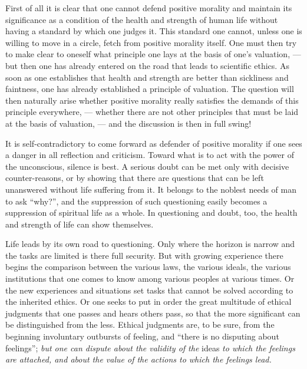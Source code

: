\documentclass[12pt,a4paper,openany]{book}
\newcommand{\opage}[1]{\marginnote{\footnotesize\textit{[#1]}}}
\begin{document}
First of all it is clear that one cannot defend positive morality and maintain its significance as
a condition of the health and strength of human life without having a standard by which one judges
it. This standard one cannot, unless one is willing to move in a circle, fetch from positive
morality itself. One must then try to make clear to oneself what principle one lays at the basis of
one's valuation, --- but then one has already entered on the road that leads to scientific ethics.
As soon as one establishes that health and strength are better than sickliness and faintness, one
has already established a principle of valuation. The question will then naturally arise whether
positive morality really satisfies the demands of this principle everywhere, --- whether there are
not other principles that must be laid at the basis of valuation, --- and the discussion is then in
full swing!

It is self-contradictory to come forward as defender of positive morality if one sees a danger in
all reflection and criticism. Toward what is to act with the power of the unconscious, silence is
best. A serious doubt can be met only with decisive counter-reasons, or by showing that there are
questions that can be left unanswered without life suffering from it. It belongs to the noblest
needs of man to ask
\opage{8}``why?'', and the suppression of such questioning easily becomes a suppression of spiritual
life as a whole. In questioning and doubt, too, the health and strength of life can show
themselves.

Life leads by its own road to questioning. Only where the horizon is narrow and the tasks are
limited is there full security. But with growing experience there begins the comparison between
the various laws, the various ideals, the various institutions that one comes to know among
various peoples at various times. Or the new experiences and situations set tasks that cannot be
solved according to the inherited ethics. Or one seeks to put in order the great multitude of
ethical judgments that one passes and hears others pass, so that the more significant can be
distinguished from the less. Ethical judgments are, to be sure, from the beginning involuntary
outbursts of feeling, and ``there is no disputing about feelings''; \textit{but one can dispute about
the validity of the} ideas \textit{to which the feelings are attached, and about the value of the
actions to which the feelings lead.}
\end{document}

